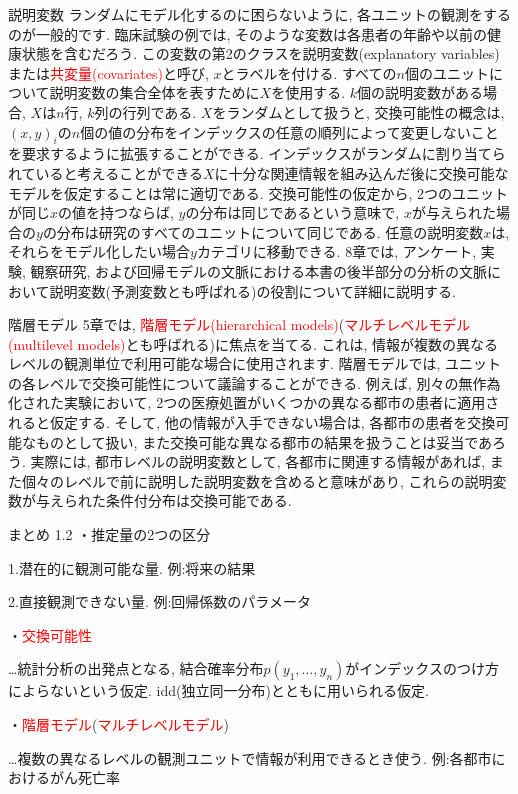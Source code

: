 \documentclass[10pt,dvipdfmx,a4]{beamer}
\newcommand{\tcr}[1]{\textcolor{red}{#1}}
\begin{document}

\begin{frame}{説明変数}
ランダムにモデル化するのに困らないように, 各ユニットの観測をするのが一般的です.
臨床試験の例では, そのような変数は各患者の年齢や以前の健康状態を含むだろう.
この変数の第2のクラスを説明変数(explanatory variables)または\tcr{共変量(covariates)}と呼び, $x$とラベルを付ける.
すべての$n$個のユニットについて説明変数の集合全体を表すために$X$を使用する.
$k$個の説明変数がある場合, $X$は$n$行, $k$列の行列である.
$X$をランダムとして扱うと, 交換可能性の概念は, $(x,y)_i$の$n$個の値の分布をインデックスの任意の順列によって変更しないことを要求するように拡張することができる.
インデックスがランダムに割り当てられていると考えることができる$X$に十分な関連情報を組み込んだ後に交換可能なモデルを仮定することは常に適切である.
交換可能性の仮定から, 2つのユニットが同じ$x$の値を持つならば, $y$の分布は同じであるという意味で, $x$が与えられた場合の$y$の分布は研究のすべてのユニットについて同じである.
任意の説明変数$x$は, それらをモデル化したい場合$y$カテゴリに移動できる.
8章では, アンケート, 実験, 観察研究, および回帰モデルの文脈における本書の後半部分の分析の文脈において説明変数(予測変数とも呼ばれる)の役割について詳細に説明する.
\end{frame}


\begin{frame}{階層モデル}
5章では, \tcr{階層モデル(hierarchical models)}(\tcr{マルチレベルモデル(multilevel models)}とも呼ばれる)に焦点を当てる.
これは, 情報が複数の異なるレベルの観測単位で利用可能な場合に使用されます.
階層モデルでは, ユニットの各レベルで交換可能性について議論することができる.
例えば, 別々の無作為化された実験において, 2つの医療処置がいくつかの異なる都市の患者に適用されると仮定する.
そして, 他の情報が入手できない場合は, 各都市の患者を交換可能なものとして扱い, また交換可能な異なる都市の結果を扱うことは妥当であろう.
実際には, 都市レベルの説明変数として, 各都市に関連する情報があれば, また個々のレベルで前に説明した説明変数を含めると意味があり, これらの説明変数が与えられた条件付分布は交換可能である.
\end{frame}


\begin{frame}{まとめ 1.2}
・推定量の2つの区分

1.潜在的に観測可能な量. 例:将来の結果

2.直接観測できない量. 例:回帰係数のパラメータ

・\tcr{交換可能性}

…統計分析の出発点となる, 結合確率分布$p(y_1,\dots,y_n)$がインデックスのつけ方によらないという仮定.
idd(独立同一分布)とともに用いられる仮定.

・\tcr{階層モデル}(\tcr{マルチレベルモデル})

…複数の異なるレベルの観測ユニットで情報が利用できるとき使う.
例:各都市におけるがん死亡率
\end{frame}
\end{document}
